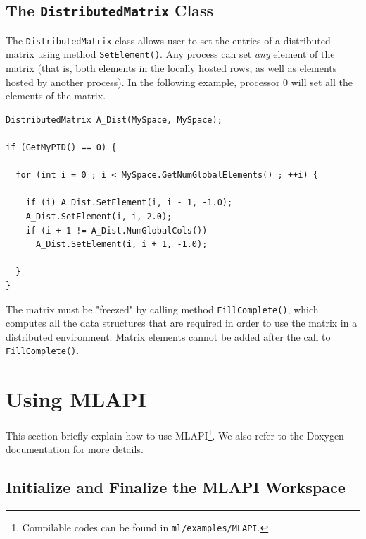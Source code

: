 \documentclass{article}[11pt]
\newcommand{\MLAPI}  {{\sc MLAPI }}
\newcommand{\MLAPIns}  {{\sc MLAPI}}
\begin{document}
\subsection{The {\tt DistributedMatrix} Class}
\label{sec:distributedmatrix}

The {\tt DistributedMatrix} class allows user to set the entries of a
distributed matrix using method {\tt SetElement()}. Any process can set {\sl
  any} element of the matrix (that is, both elements in the locally hosted
rows, as well as elements hosted by another process). In the following
  example, processor 0 will set all the elements of the matrix.
\begin{verbatim}
DistributedMatrix A_Dist(MySpace, MySpace);

if (GetMyPID() == 0) {

  for (int i = 0 ; i < MySpace.GetNumGlobalElements() ; ++i) {

    if (i) A_Dist.SetElement(i, i - 1, -1.0);
    A_Dist.SetElement(i, i, 2.0);
    if (i + 1 != A_Dist.NumGlobalCols())
      A_Dist.SetElement(i, i + 1, -1.0);

  }
}
\end{verbatim}
The matrix must be "freezed" by calling method {\tt FillComplete()}, which
computes all the data structures that are required in order to use the matrix
in a distributed environment. Matrix elements cannot be added after the call
to {\tt FillComplete()}.

\section{Using \MLAPI}
\label{sec:usage}

This section briefly explain how to use \MLAPIns\footnote{Compilable codes
can be found in {\tt ml/examples/MLAPI}.}. We also refer to the Doxygen
documentation for more details.

\subsection{Initialize and Finalize the \MLAPI Workspace}
\label{sec:workspace}
\end{document}
